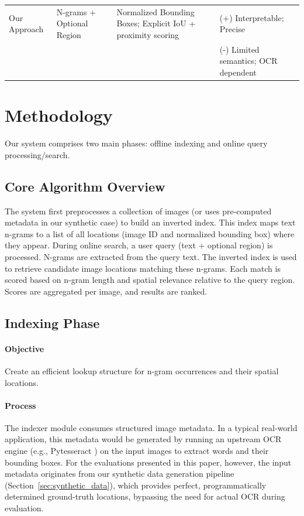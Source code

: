 \documentclass[manuscript,screen]{acmart}
\begin{document}
\begin{table}
\begin{tabular}{p{2.8cm}p{2.8cm}p{4.5cm}p{3.4cm}}
        \midrule
        Our Approach                                 & N-grams + Optional Region & Normalized Bounding Boxes; Explicit IoU + proximity scoring                   & (+) Interpretable; Precise           \\
                                                     &                           &                                                                               & (-) Limited semantics; OCR dependent \\
        \bottomrule
    \end{tabular}
\end{table}

\section{Methodology}

Our system comprises two main phases: offline indexing and online query processing/search.

\subsection{Core Algorithm Overview}

The system first preprocesses a collection of images (or uses pre-computed metadata in our synthetic case) to build an inverted index. This index maps text n-grams to a list of all locations (image ID and normalized bounding box) where they appear. During online search, a user query (text + optional region) is processed. N-grams are extracted from the query text. The inverted index is used to retrieve candidate image locations matching these n-grams. Each match is scored based on n-gram length and spatial relevance relative to the query region. Scores are aggregated per image, and results are ranked.

\subsection{Indexing Phase}

\paragraph{Objective} Create an efficient lookup structure for n-gram occurrences and their spatial locations.

\paragraph{Process} The indexer module consumes structured image metadata. In a typical real-world application, this metadata would be generated by running an upstream OCR engine (e.g., Pytesseract \cite{Smith2007AnOV}) on the input images to extract words and their bounding boxes. For the evaluations presented in this paper, however, the input metadata originates from our synthetic data generation pipeline (Section~\ref{sec:synthetic_data}), which provides perfect, programmatically determined ground-truth locations, bypassing the need for actual OCR during evaluation.
\end{document}
